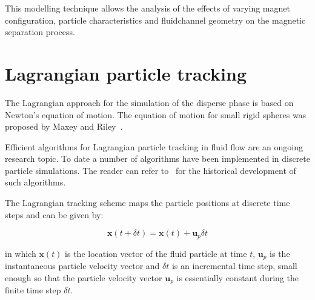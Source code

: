 This modelling technique allows the analysis of the effects of varying magnet configuration, particle characteristics and fluidchannel geometry on the magnetic separation process.

\section{Lagrangian particle tracking}\label{sec:lagrangianParticleTracking}
The Lagrangian approach for the simulation of the disperse phase is based on Newton's equation of motion. The equation of motion for small rigid spheres was proposed by Maxey and Riley~\cite{Maxey1983}.

Efficient algorithms for Lagrangian particle tracking in fluid flow are an ongoing research topic. To date a number of algorithms have been implemented in discrete particle simulations. The reader can refer to~\cite{Gouesbet1999,Lain2002,Stuart2011} for the historical development of such algorithms.

The Lagrangian tracking scheme maps the particle positions at discrete time steps and can be given by: 

\begin{equation}
	\mathbf{x}(t+\delta t) = \mathbf{x}(t)+\mathbf{u}_{p}\delta t
	\label{eqn:lagrangianEquation}
\end{equation}

in which $\mathbf{x}(t)$ is the location vector of the fluid particle at time $t$, $\mathbf{u}_{p}$ is the instantaneous particle velocity vector and $\delta t$ is an incremental time step, small enough so that the particle velocity vector $\mathbf{u}_{p}$ is essentially constant during the finite time step $\delta t$.



